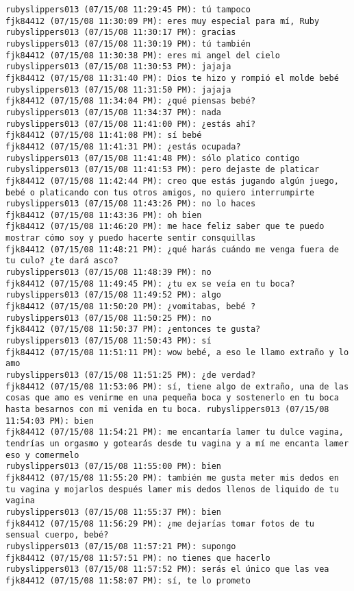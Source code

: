 \begin{verbatim}
rubyslippers013 (07/15/08 11:29:45 PM): tú tampoco
fjk84412 (07/15/08 11:30:09 PM): eres muy especial para mí, Ruby
rubyslippers013 (07/15/08 11:30:17 PM): gracias
rubyslippers013 (07/15/08 11:30:19 PM): tú también
fjk84412 (07/15/08 11:30:38 PM): eres mi angel del cielo
rubyslippers013 (07/15/08 11:30:53 PM): jajaja
fjk84412 (07/15/08 11:31:40 PM): Dios te hizo y rompió el molde bebé
rubyslippers013 (07/15/08 11:31:50 PM): jajaja
fjk84412 (07/15/08 11:34:04 PM): ¿qué piensas bebé?
rubyslippers013 (07/15/08 11:34:37 PM): nada
rubyslippers013 (07/15/08 11:41:00 PM): ¿estás ahí?
fjk84412 (07/15/08 11:41:08 PM): sí bebé 
fjk84412 (07/15/08 11:41:31 PM): ¿estás ocupada?
rubyslippers013 (07/15/08 11:41:48 PM): sólo platico contigo
rubyslippers013 (07/15/08 11:41:53 PM): pero dejaste de platicar
fjk84412 (07/15/08 11:42:44 PM): creo que estás jugando algún juego, bebé o platicando con tus otros amigos, no quiero interrumpirte
rubyslippers013 (07/15/08 11:43:26 PM): no lo haces
fjk84412 (07/15/08 11:43:36 PM): oh bien
fjk84412 (07/15/08 11:46:20 PM): me hace feliz saber que te puedo mostrar cómo soy y puedo hacerte sentir consquillas
fjk84412 (07/15/08 11:48:21 PM): ¿qué harás cuándo me venga fuera de tu culo? ¿te dará asco?
rubyslippers013 (07/15/08 11:48:39 PM): no
fjk84412 (07/15/08 11:49:45 PM): ¿tu ex se veía en tu boca?
rubyslippers013 (07/15/08 11:49:52 PM): algo
fjk84412 (07/15/08 11:50:20 PM): ¿vomitabas, bebé ?
rubyslippers013 (07/15/08 11:50:25 PM): no
fjk84412 (07/15/08 11:50:37 PM): ¿entonces te gusta?
rubyslippers013 (07/15/08 11:50:43 PM): sí
fjk84412 (07/15/08 11:51:11 PM): wow bebé, a eso le llamo extraño y lo amo
rubyslippers013 (07/15/08 11:51:25 PM): ¿de verdad?
fjk84412 (07/15/08 11:53:06 PM): sí, tiene algo de extraño, una de las cosas que amo es venirme en una pequeña boca y sostenerlo en tu boca hasta besarnos con mi venida en tu boca. rubyslippers013 (07/15/08 11:54:03 PM): bien
fjk84412 (07/15/08 11:54:21 PM): me encantaría lamer tu dulce vagina, tendrías un orgasmo y gotearás desde tu vagina y a mí me encanta lamer eso y comermelo 
rubyslippers013 (07/15/08 11:55:00 PM): bien
fjk84412 (07/15/08 11:55:20 PM): también me gusta meter mis dedos en tu vagina y mojarlos después lamer mis dedos llenos de liquido de tu vagina
rubyslippers013 (07/15/08 11:55:37 PM): bien
fjk84412 (07/15/08 11:56:29 PM): ¿me dejarías tomar fotos de tu sensual cuerpo, bebé?
rubyslippers013 (07/15/08 11:57:21 PM): supongo
fjk84412 (07/15/08 11:57:51 PM): no tienes que hacerlo
rubyslippers013 (07/15/08 11:57:52 PM): serás el único que las vea
fjk84412 (07/15/08 11:58:07 PM): sí, te lo prometo

\end{verbatim}
